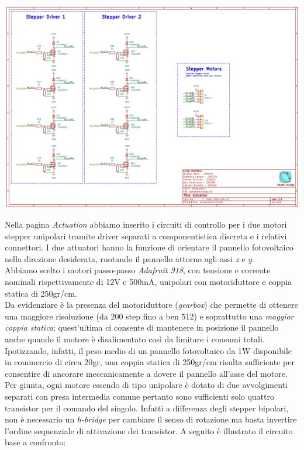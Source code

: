 \begin{center}
\includegraphics[scale=0.5]{figures/image41.png}
\captionsetup{type=figure}
\end{center}

\noindent Nella pagina \emph{Actuation} abbiamo inserito i circuiti di controllo per 
i due motori stepper unipolari tramite driver separati a
componentistica discreta e i relativi connettori. I due attuatori hanno
la funzione di orientare il pannello fotovoltaico nella direzione
desiderata, ruotando il pannello attorno agli assi \emph{z} e \emph{y}.\\
Abbiamo scelto i motori passo-passo \emph{Adafruit 918}, con tensione e
corrente nominali rispettivamente di 12V e 500mA, unipolari con
motoriduttore e coppia statica di 250gr/cm.\\
Da evidenziare è la presenza del motoriduttore (\emph{gearbox}) che
permette di ottenere una maggiore risoluzione (da 200 step fino a ben
512) e soprattutto una \emph{maggior coppia statica}; quest'ultima ci
consente di mantenere in posizione il pannello anche quando il motore è
disalimentato così da limitare i consumi totali. Ipotizzando, infatti,
il peso medio di un pannello fotovoltaico da 1W disponibile in commercio
di circa 20gr, una coppia statica di 250gr/cm risulta sufficiente per
consentire di ancorare meccanicamente a dovere il pannello all'asse del
motore.\\
Per giunta, ogni motore essendo di tipo unipolare è dotato di due
avvolgimenti separati con presa intermedia comune pertanto sono
sufficienti solo quattro transistor per il comando del singolo. Infatti
a differenza degli stepper bipolari, non è necessario un \emph{h-bridge}
per cambiare il senso di rotazione ma basta invertire l'ordine
sequenziale di attivazione dei transistor. A seguito è illustrato il
circuito base a confronto:

